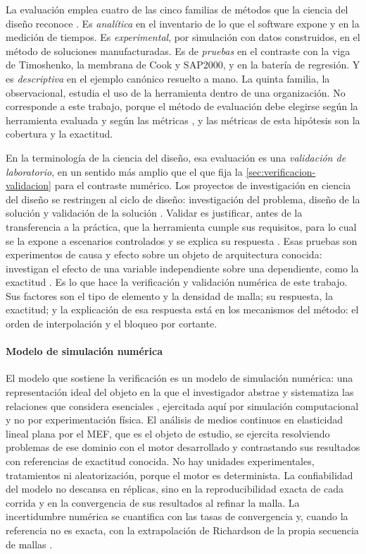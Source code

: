 La evaluación emplea cuatro de las cinco familias de métodos que la ciencia del diseño reconoce \autocite[p.~86]{hevner2004design}. Es \emph{analítica} en el inventario de lo que el software expone y en la medición de tiempos. Es \emph{experimental}, por simulación con datos construidos, en el método de soluciones manufacturadas. Es de \emph{pruebas} en el contraste con la viga de Timoshenko, la membrana de Cook y SAP2000, y en la batería de regresión. Y es \emph{descriptiva} en el ejemplo canónico resuelto a mano. La quinta familia, la observacional, estudia el uso de la herramienta dentro de una organización. No corresponde a este trabajo, porque el método de evaluación debe elegirse según la herramienta evaluada y según las métricas \autocite[p.~86]{hevner2004design}, y las métricas de esta hipótesis son la cobertura y la exactitud.

En la terminología de la ciencia del diseño, esa evaluación es una \emph{validación de laboratorio}, en un sentido más amplio que el que fija la \autoref{sec:verificacion-validacion} para el contraste numérico. Los proyectos de investigación en ciencia del diseño se restringen al ciclo de diseño: investigación del problema, diseño de la solución y validación de la solución \autocite[p.~30]{wieringa2014design}. Validar es justificar, antes de la transferencia a la práctica, que la herramienta cumple sus requisitos, para lo cual se la expone a escenarios controlados y se explica su respuesta \autocite[p.~31]{wieringa2014design}. Esas pruebas son experimentos de causa y efecto sobre un objeto de arquitectura conocida: investigan el efecto de una variable independiente sobre una dependiente, como la exactitud \autocite[p.~247]{wieringa2014design}. Es lo que hace la verificación y validación numérica de este trabajo. Sus factores son el tipo de elemento y la densidad de malla; su respuesta, la exactitud; y la explicación de esa respuesta está en los mecanismos del método: el orden de interpolación y el bloqueo por cortante.

\paragraph{Modelo de simulación numérica} El modelo que sostiene la verificación es un modelo de simulación numérica: una representación ideal del objeto en la que el investigador abstrae y sistematiza las relaciones que considera esenciales \autocite[p.~21]{alvarez_metodologia}, ejercitada aquí por simulación computacional y no por experimentación física. El análisis de medios continuos en elasticidad lineal plana por el MEF, que es el objeto de estudio, se ejercita resolviendo problemas de ese dominio con el motor desarrollado y contrastando sus resultados con referencias de exactitud conocida. No hay unidades experimentales, tratamientos ni aleatorización, porque el motor es determinista. La confiabilidad del modelo no descansa en réplicas, sino en la reproducibilidad exacta de cada corrida y en la convergencia de sus resultados al refinar la malla. La incertidumbre numérica se cuantifica con las tasas de convergencia y, cuando la referencia no es exacta, con la extrapolación de Richardson de la propia secuencia de mallas \autocite[pp.~309-312]{oberkampf2010vv}.

